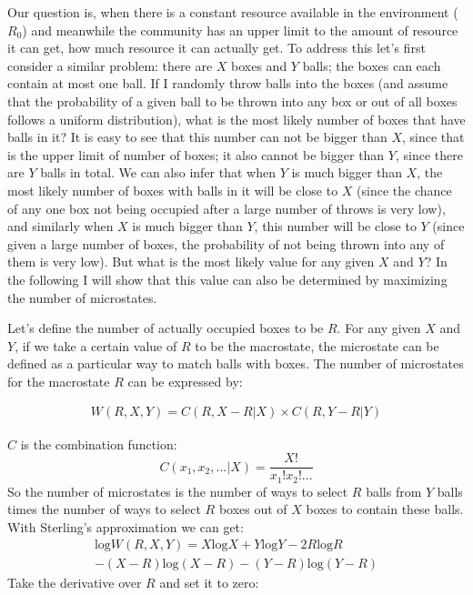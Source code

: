 \documentclass[12pt]{article}
\begin{document}
Our question is, when there is a constant resource available in the environment ($R_0$) and meanwhile the community has an upper limit to the amount of resource it can get, how much resource it can actually get. To address this let's first consider a similar problem: there are $X$ boxes and $Y$ balls; the boxes can each contain at most one ball. If I randomly throw balls into the boxes (and assume that the probability of a given ball to be thrown into any box or out of all boxes follows a uniform distribution), what is the most likely number of boxes that have balls in it? It is easy to see that this number can not be bigger than $X$, since that is the upper limit of number of boxes; it also cannot be bigger than $Y$, since there are $Y$ balls in total. We can also infer that when $Y$ is much bigger than $X$, the most likely number of boxes with balls in it will be close to $X$ (since the chance of any one box not being occupied after a large number of throws is very low), and similarly when $X$ is much bigger than $Y$, this number will be close to $Y$ (since given a large number of boxes, the probability of not being thrown into any of them is very low). But what is the most likely value for any given $X$ and $Y$? In the following I will show that this value can also be determined by maximizing the number of microstates.

Let's define the number of actually occupied boxes to be $R$. For any given $X$ and $Y$, if we take a certain value of $R$ to be the macrostate, the microstate can be defined as a particular way to match balls with boxes. The number of microstates for the macrostate $R$ can be expressed by:
 
  \begin{equation}
 \begin{split}
W(R,X,Y) = C(R,X-R|X) \times C(R,Y-R|Y)
\end{split}
\end{equation}

$C$ is the combination function:
\begin{equation}
C(x_1,x_2,... |X) = \frac{X!}{x_1! x_2! ...}
\end{equation}
So the number of microstates is the number of ways to select $R$ balls from $Y$ balls times the number of ways to select $R$ boxes out of $X$ boxes to contain these balls. With Sterling's approximation we can get:
  \begin{equation}
 \begin{split}
\mbox{log} W(R,X,Y) = X \mbox{log} X + Y \mbox{log} Y - 2 R \mbox{log} R \\
 - (X-R) \mbox{log} (X-R) - (Y-R) \mbox{log} (Y-R)
\end{split}
\end{equation}
Take the derivative over $R$ and set it to zero:
\end{document}
